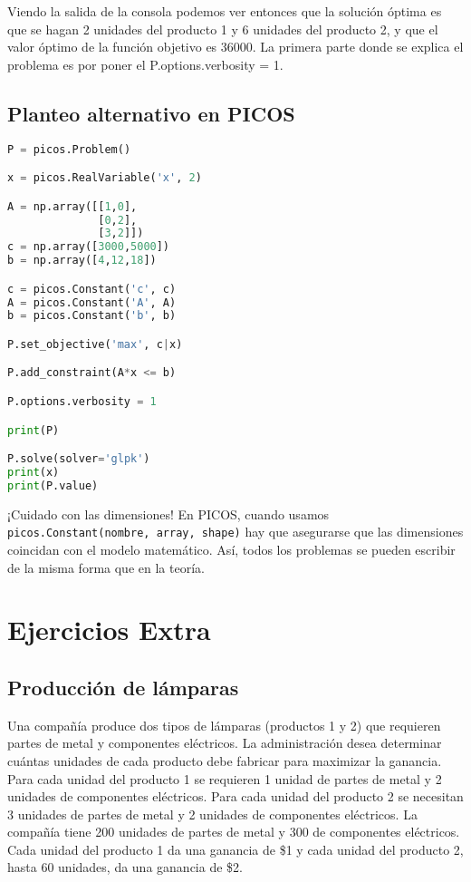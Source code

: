 \documentclass[12pt]{article}
\begin{document}
Viendo la salida de la consola podemos ver entonces que la solución óptima es que se hagan 2 unidades del producto 1 y 6 unidades del producto 2, y que el valor óptimo de la función objetivo es 36000. La primera parte donde se explica el problema es por poner el P.options.verbosity = 1.

\subsection{Planteo alternativo en PICOS}

\begin{lstlisting}[language=Python]
P = picos.Problem()

x = picos.RealVariable('x', 2)

A = np.array([[1,0],
              [0,2],
              [3,2]])
c = np.array([3000,5000])
b = np.array([4,12,18])

c = picos.Constant('c', c)
A = picos.Constant('A', A)
b = picos.Constant('b', b)

P.set_objective('max', c|x)

P.add_constraint(A*x <= b)

P.options.verbosity = 1

print(P)

P.solve(solver='glpk')
print(x)
print(P.value)
\end{lstlisting}

¡Cuidado con las dimensiones! En PICOS, cuando usamos \texttt{picos.Constant(nombre, array, shape)} hay que asegurarse que las dimensiones coincidan con el modelo matemático. Así, todos los problemas se pueden escribir de la misma forma que en la teoría.

\section{Ejercicios Extra}

\subsection{Producción de lámparas}

Una compañía produce dos tipos de lámparas (productos 1 y 2) que requieren partes de metal y componentes eléctricos. La administración desea determinar cuántas unidades de cada producto debe fabricar para maximizar la ganancia. Para cada unidad del producto 1 se requieren 1 unidad de partes de metal y 2 unidades de componentes eléctricos. Para cada unidad del producto 2 se necesitan 3 unidades de partes de metal y 2 unidades de componentes eléctricos. La compañía tiene 200 unidades de partes de metal y 300 de componentes eléctricos. Cada unidad del producto 1 da una ganancia de \$1 y cada unidad del producto 2, hasta 60 unidades, da una ganancia de \$2.
\end{document}
